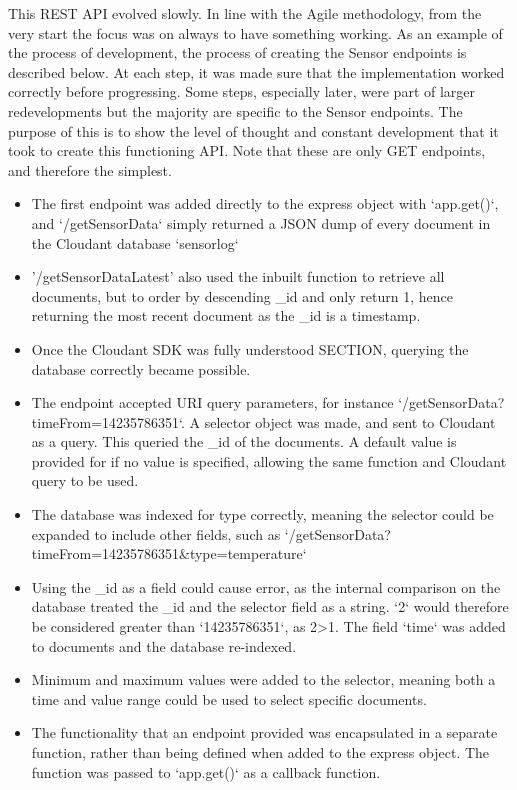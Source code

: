 \documentclass{article}
\begin{document}
This REST API evolved slowly. In line with the Agile methodology, from the very start the focus was on always to have something working. As an example of the process of development, the process of creating the Sensor endpoints is described below. At each step, it was made sure that the implementation worked correctly before progressing. Some steps, especially later, were part of larger redevelopments but the majority are specific to the Sensor endpoints. The purpose of this is to show the level of thought and constant development that it took to create this functioning API. Note that these are only GET endpoints, and therefore the simplest.

\begin{itemize}
	\item The first endpoint was added directly to the express object with `app.get()`, and `/getSensorData` simply returned a JSON dump of every document in the Cloudant database `sensorlog`
	\item '/getSensorDataLatest' also used the inbuilt function to retrieve all documents, but to order by descending \_id and only return 1, hence returning the most recent document as the \_id is a timestamp. 
	\item Once the Cloudant SDK was fully understood SECTION, querying the database correctly became possible.
	\item The endpoint accepted URI query parameters, for instance `/getSensorData?timeFrom=14235786351`. A selector object was made, and sent to Cloudant as a query. This queried the \_id of the documents. A default value is provided for if no value is specified, allowing the same function and Cloudant query to be used.
	\item The database was indexed for type correctly, meaning the selector could be expanded to include other fields, such as `/getSensorData?timeFrom=14235786351\&type=temperature`
	\item Using the \_id as a field could cause error, as the internal comparison on the database treated the \_id and the selector field as a string. `2` would therefore be considered greater than `14235786351`, as 2\textgreater 1. The field `time` was added to documents and the database re-indexed.
	\item Minimum and maximum values were added to the selector, meaning both a time and value range could be used to select specific documents.
	\item The functionality that an endpoint provided was encapsulated in a separate function, rather than being defined when added to the express object. The function was passed to `app.get()` as a callback function.

\end{itemize}
\end{document}

